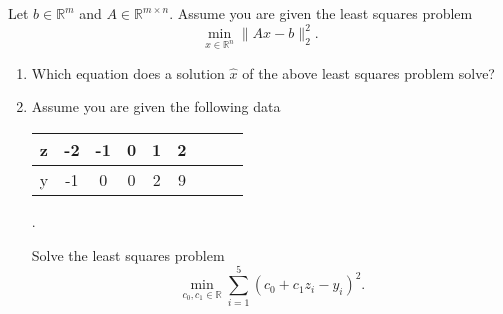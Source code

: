 Let $b \in \mathbb{R}^m$ and $A \in \mathbb{R}^{m\times n}$.
Assume you are given the least squares problem 
$$
\min\limits_{x \in \mathbb{R}^n } \| Ax - b \|_2^2.
$$
\begin{enumerate}
	\item Which equation does a solution $\hat{x}$ of the above least squares problem solve?
	\item Assume you are given the following data
	\begin{center}
		\begin{tabular}{|l|c|c|c|c|c|c||c|c|}\hline
			z&-2&-1&0&1&2\\ 
			\hline
			y&-1&0&0&2&9\\
			\hline
		\end{tabular}.
	\end{center}
	Solve the least squares problem
	$$
	\min\limits_{c_0, c_1 \in \mathbb{R}} \sum_{i=1}^5 (c_0 + c_1z_i - y_i)^2.
	$$
\end{enumerate}
